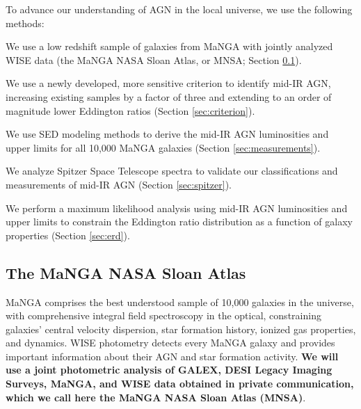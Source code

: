 \documentclass[12pt, preprint]{hacked-aastex}
\newlength{\mylen}
\newenvironment{ditemize}
{ \begin{list}{}{%
\setlength{\topsep}{0pt}%
\setlength{\partopsep}{3pt}%
\setlength{\itemsep}{1pt}\setlength{\parsep}{1pt}%
\setlength{\itemindent}{0pt}\setlength{\listparindent}{12pt}%
\setlength{\leftmargin}{24pt}\setlength{\rightmargin}{0in}%
\setlength{\labelsep}{3pt}\setlength{\labelwidth}{6pt}%
\setlength{\mylen}{3pt}
\renewcommand{\makelabel}{\makebox[\labelwidth][l]{\raisebox{\mylen}{\tiny$\bullet$}\hspace{\fill}}}}}
{\end{list}}
\begin{document}
To advance our understanding of AGN in the local universe, we use the
following methods:
\begin{ditemize}
    \item We use a low redshift sample of galaxies from MaNGA with 
    jointly analyzed WISE data (the MaNGA NASA Sloan Atlas, or MNSA;
    Section \ref{sec:mnsa}).
    \item We use a newly developed, more sensitive criterion to 
    identify mid-IR AGN, increasing existing samples by a factor of
    three and extending to an order of magnitude lower Eddington
    ratios (Section \ref{sec:criterion}).
    \item We use SED modeling methods to derive the mid-IR AGN
      luminosities and upper limits for all 10,000 MaNGA galaxies
      (Section \ref{sec:measurements}).
    \item We analyze Spitzer Space Telescope spectra to validate our 
    classifications and measurements of mid-IR AGN (Section
    \ref{sec:spitzer}).
    \item We perform a maximum likelihood analysis using mid-IR AGN luminosities 
     and upper limits to constrain the Eddington ratio  distribution as a 
     function of galaxy properties (Section \ref{sec:erd}).
\end{ditemize}

\subsection{The MaNGA NASA Sloan Atlas}
\label{sec:mnsa}

MaNGA comprises the best understood sample of 10,000 galaxies in the
universe, with comprehensive integral field spectroscopy in the
optical, constraining galaxies' central velocity dispersion, star
formation history, ionized gas properties, and dynamics. WISE
photometry detects every MaNGA galaxy and provides important
information about their AGN and star formation activity.  {\bf We will
  use a joint photometric analysis of GALEX, DESI Legacy Imaging
  Surveys, MaNGA, and WISE data obtained in private communication,
  which we call here the MaNGA NASA Sloan Atlas (MNSA)}.
\end{document}
